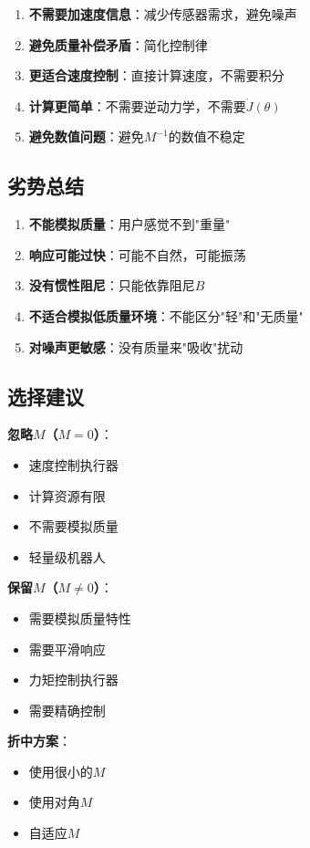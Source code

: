 \documentclass[12pt,a4paper]{article}
\begin{document}
\begin{enumerate}
\item \textbf{不需要加速度信息}：减少传感器需求，避免噪声
\item \textbf{避免质量补偿矛盾}：简化控制律
\item \textbf{更适合速度控制}：直接计算速度，不需要积分
\item \textbf{计算更简单}：不需要逆动力学，不需要$\dot{J}(\theta)$
\item \textbf{避免数值问题}：避免$M^{-1}$的数值不稳定
\end{enumerate}

\subsection{劣势总结}

\begin{enumerate}
\item \textbf{不能模拟质量}：用户感觉不到"重量"
\item \textbf{响应可能过快}：可能不自然，可能振荡
\item \textbf{没有惯性阻尼}：只能依靠阻尼$B$
\item \textbf{不适合模拟低质量环境}：不能区分"轻"和"无质量"
\item \textbf{对噪声更敏感}：没有质量来"吸收"扰动
\end{enumerate}

\subsection{选择建议}

\textbf{忽略$M$（$M = 0$）}：
\begin{itemize}
\item 速度控制执行器
\item 计算资源有限
\item 不需要模拟质量
\item 轻量级机器人
\end{itemize}

\textbf{保留$M$（$M \neq 0$）}：
\begin{itemize}
\item 需要模拟质量特性
\item 需要平滑响应
\item 力矩控制执行器
\item 需要精确控制
\end{itemize}

\textbf{折中方案}：
\begin{itemize}
\item 使用很小的$M$
\item 使用对角$M$
\item 自适应$M$
\end{itemize}
\end{document}
